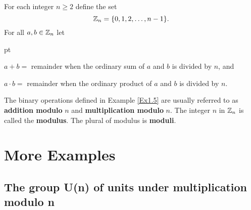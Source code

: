 \begin{ex} \label{Ex1.5} For each integer $n \ge 2$ define the set 
        $$
        \mathbb Z_n = \{ 0, 1, 2, \dots, n-1 \}.
        $$ For all $a, b \in \mathbb Z_n$ let
        
         pt
        
        \noindent $a + b = $  remainder when the ordinary sum of
        $a$ and $b$ is divided by $n$, and 
        
        \vskip 3pt 
        
        \noindent $a \cdot b = $  remainder when the ordinary product of
        $a$ and $b$ is divided by $n$.
        
\end{ex}

The binary operations defined in Example \ref{Ex1.5} are usually
referred to as {\bf addition modulo} $n$
and  {\bf multiplication modulo}
$n$. The integer
$n$ in $\mathbb Z_n$ is  called the {\bf modulus}. The plural of
modulus is {\bf moduli}. 

\begin{comment}
In Example \ref{Ex1.5},  it would be more precise to use something like
$a +_n b$ and $a \cdot_n b$ for addition and multiplication in
$\Z_n$, but in the interest of keeping the notation simple we omit the
subscript $n$. Of course, this means that in any given situation,  we
must be very clear about the value of $n$.  Note also that this is
really an infinite class of examples: $\Z_2 =
\{0,1\}$, 
$\Z_3 = \{0,1,2\}$, $\Z_4 = \{0,1,2,3\}$, etc. Just to be clear, we give
a few examples of addition and multiplication:
\begin{description}
        \item [In $\Z_4$:] $2 + 3 =1$, $2 + 2 = 0$, $0 + 3 = 3$, $2\cdot3= 2$,
        $2\cdot2=0$ and $1\cdot3=3$.
        \item[In $\Z_5$:] $2 + 3 =0$,  $2 + 2 = 4$, $0 + 3 = 3$,
        $2\cdot3=1$,
        $2\cdot2=4$ and $1\cdot3=3$
\end{description} 
\end{comment}

\section{More Examples}
\subsection{The group U(n) of units under multiplication modulo n}

